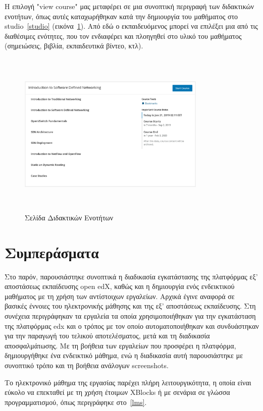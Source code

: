 \documentclass[12pt]{report}
\begin{document}
Η επιλογή \textlatin{"view course"} μας μεταφέρει σε μια συνοπτική περιγραφή των διδακτικών ενοτήτων, όπως αυτές καταχωρήθηκαν κατά την δημιουργία του μαθήματος στο \textlatin{studio}~\ref{studio} (εικόνα~\ref{fig:microsite-course2}). Από εδώ ο εκπαιδευόμενος μπορεί να επιλέξει μια από τις διαθέσιμες ενότητες, που τον ενδιαφέρει και πλοηγηθεί στο υλικό του μαθήματος (σημειώσεις, βιβλία, εκπαιδευτικά βίντεο, κτλ).
\begin{figure}[h]
\centering
\includegraphics[width=0.8\textwidth, height=8cm]{microsite-course2}
\caption{Σελίδα Διδακτικών Ενοτήτων}
\label{fig:microsite-course2}
\end{figure}

\section{Συμπεράσματα}
Στο παρόν, παρουσιάστηκε συνοπτικά η διαδικασία εγκατάστασης της πλατφόρμας εξ' αποστάσεως εκπαίδευσης \textlatin{open edX}, καθώς και η δημιουργία ενός ενδεικτικού μαθήματος με τη χρήση των αντίστοιχων εργαλείων. Αρχικά έγινε αναφορά σε βασικές έννοιες του ηλεκτρονικής μάθησης και της εξ' αποστάσεως εκπαίδευσης. Στη συνέχεια περιγράφηκαν τα εργαλεία τα οποία χρησιμοποιήθηκαν για την εγκατάσταση της πλατφόρμας \textlatin{edx} και ο τρόπος με τον οποίο αυτοματοποιήθηκαν και συνδυάστηκαν για την παραγωγή του τελικού αποτελέσματος, μετά και τη διαδικασία αποσφαλμάτωσης. Με τη βοήθεια των εργαλείων που προσφέρει η πλατφόρμα, δημιουργήθηκε ένα ενδεικτικό μάθημα, ενώ η διαδικασία αυτή παρουσιάστηκε με συνοπτικό τρόπο και τη βοήθεια ανάλογων \textlatin{screenshots}.

Το ηλεκτρονικό μάθημα της εργασίας παρέχει πλήρη λειτουργικότητα, η οποία είναι εύκολο να επεκταθεί με τη χρήση έτοιμων \textlatin{XBlocks} ή με σενάρια σε γλώσσα προγραμματισμού, όπως περιγράφηκε στο~\ref{lms}.
\end{document}

